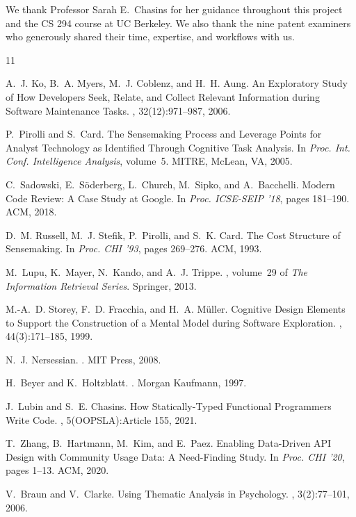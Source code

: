 \documentclass[sigconf]{acmart}
\begin{document}
\begin{acks}
We thank Professor Sarah E.\ Chasins for her guidance throughout this project and the CS 294 course at UC Berkeley. We also thank the nine patent examiners who generously shared their time, expertise, and workflows with us.
\end{acks}

\begin{thebibliography}{11}

A.~J. Ko, B.~A. Myers, M.~J. Coblenz, and H.~H. Aung.
\newblock An Exploratory Study of How Developers Seek, Relate, and Collect Relevant Information during Software Maintenance Tasks.
, 32(12):971--987, 2006.

P.~Pirolli and S.~Card.
\newblock The Sensemaking Process and Leverage Points for Analyst Technology as Identified Through Cognitive Task Analysis.
\newblock In {\em Proc. Int. Conf. Intelligence Analysis}, volume~5. MITRE, McLean, VA, 2005.

C.~Sadowski, E.~S{\"o}derberg, L.~Church, M.~Sipko, and A.~Bacchelli.
\newblock Modern Code Review: A Case Study at Google.
\newblock In {\em Proc. ICSE-SEIP '18}, pages 181--190. ACM, 2018.

D.~M. Russell, M.~J. Stefik, P.~Pirolli, and S.~K. Card.
\newblock The Cost Structure of Sensemaking.
\newblock In {\em Proc. CHI '93}, pages 269--276. ACM, 1993.

M.~Lupu, K.~Mayer, N.~Kando, and A.~J. Trippe.
, volume~29 of {\em The Information Retrieval Series}.
\newblock Springer, 2013.

M.-A.~D. Storey, F.~D. Fracchia, and H.~A. M{\"u}ller.
\newblock Cognitive Design Elements to Support the Construction of a Mental Model during Software Exploration.
, 44(3):171--185, 1999.

N.~J. Nersessian.
.
\newblock MIT Press, 2008.

H.~Beyer and K.~Holtzblatt.
.
\newblock Morgan Kaufmann, 1997.

J.~Lubin and S.~E. Chasins.
\newblock How Statically-Typed Functional Programmers Write Code.
, 5(OOPSLA):Article 155, 2021.

T.~Zhang, B.~Hartmann, M.~Kim, and E.~Paez.
\newblock Enabling Data-Driven API Design with Community Usage Data: A Need-Finding Study.
\newblock In {\em Proc. CHI '20}, pages 1--13. ACM, 2020.

V.~Braun and V.~Clarke.
\newblock Using Thematic Analysis in Psychology.
, 3(2):77--101, 2006.

\end{thebibliography}
\end{document}

